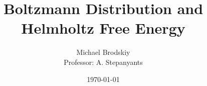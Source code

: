 


\title{Boltzmann Distribution and Helmholtz Free Energy}
\date{\today}
\author{Michael Brodskiy\\ \small Professor: A. Stepanyants}



\maketitle

